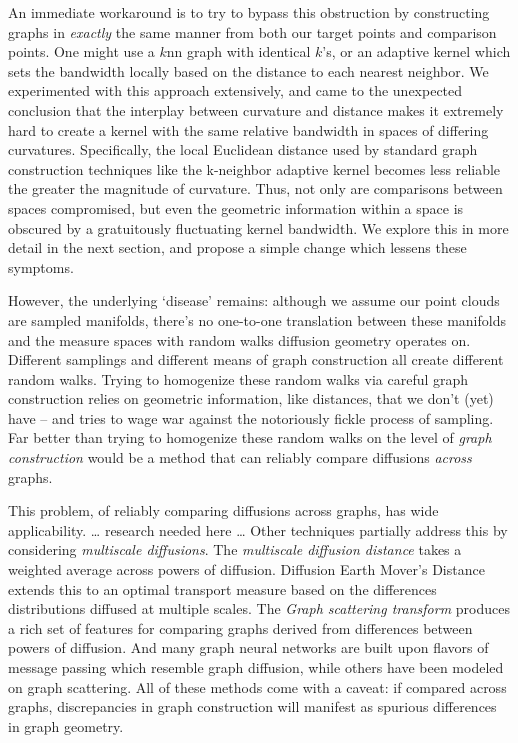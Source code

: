 \documentclass[
  letterpaper,
  DIV=11,
  numbers=noendperiod]{scrartcl}
\theoremstyle{plain}
\theoremstyle{plain}
\theoremstyle{definition}
\theoremstyle{plain}
\theoremstyle{definition}
\theoremstyle{plain}
\theoremstyle{remark}
\begin{document}
An immediate workaround is to try to bypass this obstruction by
constructing graphs in \emph{exactly} the same manner from both our
target points and comparison points. One might use a \(k\)nn graph with
identical \(k\)'s, or an adaptive kernel which sets the bandwidth
locally based on the distance to each nearest neighbor. We experimented
with this approach extensively, and came to the unexpected conclusion
that the interplay between curvature and distance makes it extremely
hard to create a kernel with the same relative bandwidth in spaces of
differing curvatures. Specifically, the local Euclidean distance used by
standard graph construction techniques like the k-neighbor adaptive
kernel becomes less reliable the greater the magnitude of curvature.
Thus, not only are comparisons between spaces compromised, but even the
geometric information within a space is obscured by a gratuitously
fluctuating kernel bandwidth. We explore this in more detail in the next
section, and propose a simple change which lessens these symptoms.

However, the underlying `disease' remains: although we assume our point
clouds are sampled manifolds, there's no one-to-one translation between
these manifolds and the measure spaces with random walks diffusion
geometry operates on. Different samplings and different means of graph
construction all create different random walks. Trying to homogenize
these random walks via careful graph construction relies on geometric
information, like distances, that we don't (yet) have -- and tries to
wage war against the notoriously fickle process of sampling. Far better
than trying to homogenize these random walks on the level of \emph{graph
construction} would be a method that can reliably compare diffusions
\emph{across} graphs.

This problem, of reliably comparing diffusions across graphs, has wide
applicability. \ldots{} research needed here \ldots{} Other techniques
partially address this by considering \emph{multiscale diffusions}. The
\emph{multiscale diffusion distance} takes a weighted average across
powers of diffusion. Diffusion Earth Mover's Distance extends this to an
optimal transport measure based on the differences distributions
diffused at multiple scales. The \emph{Graph scattering transform}
produces a rich set of features for comparing graphs derived from
differences between powers of diffusion. And many graph neural networks
are built upon flavors of message passing which resemble graph
diffusion, while others have been modeled on graph scattering. All of
these methods come with a caveat: if compared across graphs,
discrepancies in graph construction will manifest as spurious
differences in graph geometry.
\end{document}
